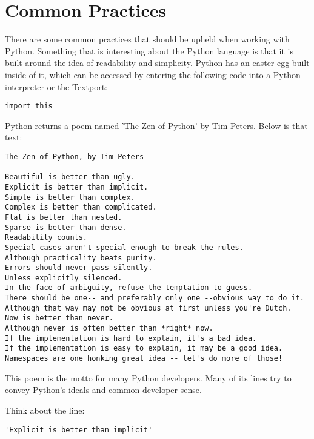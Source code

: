 
\section{Common Practices}

\begin{fullwidth}

There are some common practices that should be upheld when working with Python. Something that is interesting about the Python language is that it is built around the idea of readability and simplicity. Python has an easter egg built inside of it, which can be accessed by entering the following code into a Python interpreter or the Textport:

\begin{lstlisting}
import this
\end{lstlisting}

Python returns a poem named 'The Zen of Python' by Tim Peters. Below is that text:

\begin{lstlisting}
The Zen of Python, by Tim Peters

Beautiful is better than ugly.
Explicit is better than implicit.
Simple is better than complex.
Complex is better than complicated.
Flat is better than nested.
Sparse is better than dense.
Readability counts.
Special cases aren't special enough to break the rules.
Although practicality beats purity.
Errors should never pass silently.
Unless explicitly silenced.
In the face of ambiguity, refuse the temptation to guess.
There should be one-- and preferably only one --obvious way to do it.
Although that way may not be obvious at first unless you're Dutch.
Now is better than never.
Although never is often better than *right* now.
If the implementation is hard to explain, it's a bad idea.
If the implementation is easy to explain, it may be a good idea.
Namespaces are one honking great idea -- let's do more of those!

\end{lstlisting}

This poem is the motto for many Python developers. Many of its lines try to convey Python's ideals and common developer sense.

Think about the line: 

\begin{lstlisting}
'Explicit is better than implicit'
\end{lstlisting}


\end{fullwidth}
